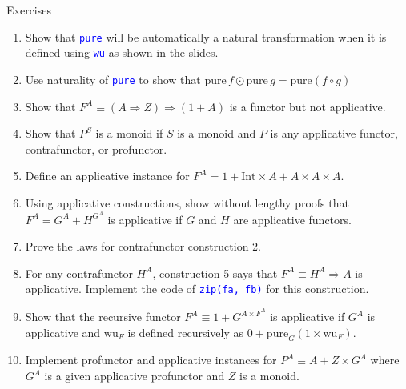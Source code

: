 \documentclass[english]{beamer}
\begin{document}
\begin{frame}{Exercises}
\begin{enumerate}
\item Show that \texttt{\textcolor{blue}{\footnotesize{}pure}} will be automatically
a natural transformation when it is defined using \texttt{\textcolor{blue}{\footnotesize{}wu}}
as shown in the slides.
\item Use naturality of \texttt{\textcolor{blue}{\footnotesize{}pure}} to
show that $\text{pure}\,f\odot\text{pure}\,g=\text{pure}\left(f\circ g\right)$
\item Show that $F^{A}\equiv\left(A\Rightarrow Z\right)\Rightarrow\left(1+A\right)$
is a functor but not applicative.
\item Show that $P^{S}$ is a monoid if $S$ is a monoid and $P$ is any
applicative functor, contrafunctor, or profunctor.
\item Define an applicative instance for $F^{A}=1+\text{Int}\times A+A\times A\times A$.
\item Using applicative constructions, show without lengthy proofs that
$F^{A}=G^{A}+H^{G^{A}}$ is applicative if $G$ and $H$ are applicative
functors.
\item Prove the laws for contrafunctor construction 2.
\item For any contrafunctor $H^{A}$, construction 5 says that $F^{A}\equiv H^{A}\Rightarrow A$
is applicative. Implement the code of \texttt{\textcolor{blue}{\footnotesize{}zip(fa,
fb)}} for this construction.
\item Show that the recursive functor $F^{A}\equiv1+G^{A\times F^{A}}$
is applicative if $G^{A}$ is applicative and $\text{wu}_{F}$ is
defined recursively as $0+\text{pure}_{G}\left(1\times\text{wu}_{F}\right)$.
\item Implement profunctor and applicative instances for $P^{A}\equiv A+Z\times G^{A}$
where $G^{A}$ is a given applicative profunctor and $Z$ is a monoid.
\end{enumerate}
\end{frame}
\end{document}
